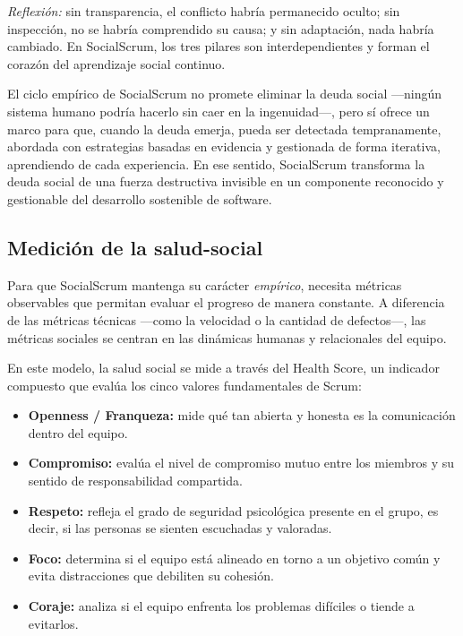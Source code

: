 \emph{Reflexión:} sin transparencia, el conflicto habría permanecido oculto; sin inspección, no se habría comprendido su causa; y sin adaptación, nada habría cambiado. En SocialScrum, los tres pilares son interdependientes y forman el corazón del aprendizaje social continuo.

El ciclo empírico de SocialScrum no promete eliminar la deuda social ---ningún sistema humano podría hacerlo sin caer en la ingenuidad---, pero sí ofrece un marco para que, cuando la deuda emerja, pueda ser detectada tempranamente, abordada con estrategias basadas en evidencia y gestionada de forma iterativa, aprendiendo de cada experiencia.
En ese sentido, SocialScrum transforma la deuda social de una fuerza destructiva invisible en un componente reconocido y gestionable del desarrollo sostenible de software.

\subsection{Medición de la salud-social}

Para que SocialScrum mantenga su carácter \textit{empírico}, necesita métricas observables que permitan evaluar el progreso de manera constante. A diferencia de las métricas técnicas —como la velocidad o la cantidad de defectos—, las métricas sociales se centran en las dinámicas humanas y relacionales del equipo.

En este modelo, la salud social se mide a través del Health Score, un indicador compuesto que evalúa los cinco valores fundamentales de Scrum:

\begin{itemize}
    \item \textbf{Openness / Franqueza:} mide qué tan abierta y honesta es la comunicación dentro del equipo.
    \item \textbf{Compromiso:} evalúa el nivel de compromiso mutuo entre los miembros y su sentido de responsabilidad compartida.
    \item \textbf{Respeto:} refleja el grado de seguridad psicológica presente en el grupo, es decir, si las personas se sienten escuchadas y valoradas.
    \item \textbf{Foco:} determina si el equipo está alineado en torno a un objetivo común y evita distracciones que debiliten su cohesión.
    \item \textbf{Coraje:} analiza si el equipo enfrenta los problemas difíciles o tiende a evitarlos.
\end{itemize}

